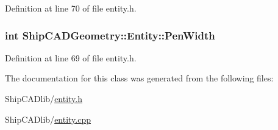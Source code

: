 Definition at line 70 of file entity.\-h.

\hypertarget{classShipCADGeometry_1_1Entity_a236c42fc6ed4a8478760baf81551620f}{
\subsubsection[{Pen\-Width}]{\setlength{\rightskip}{0pt plus 5cm}int Ship\-C\-A\-D\-Geometry\-::\-Entity\-::\-Pen\-Width}}\label{classShipCADGeometry_1_1Entity_a236c42fc6ed4a8478760baf81551620f}


Definition at line 69 of file entity.\-h.



The documentation for this class was generated from the following files\-:\begin{DoxyCompactItemize}
\item 
Ship\-C\-A\-Dlib/\hyperlink{entity_8h}{entity.\-h}\item 
Ship\-C\-A\-Dlib/\hyperlink{entity_8cpp}{entity.\-cpp}\end{DoxyCompactItemize}
